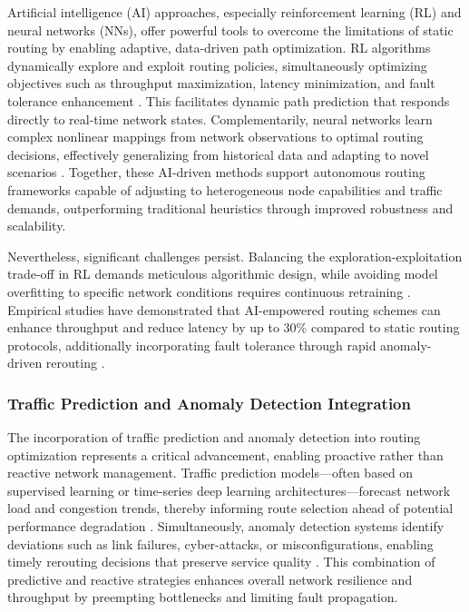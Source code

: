 \documentclass[sigconf]{acmart}
\begin{document}
Artificial intelligence (AI) approaches, especially reinforcement learning (RL) and neural networks (NNs), offer powerful tools to overcome the limitations of static routing by enabling adaptive, data-driven path optimization. RL algorithms dynamically explore and exploit routing policies, simultaneously optimizing objectives such as throughput maximization, latency minimization, and fault tolerance enhancement \cite{ref4}. This facilitates dynamic path prediction that responds directly to real-time network states. Complementarily, neural networks learn complex nonlinear mappings from network observations to optimal routing decisions, effectively generalizing from historical data and adapting to novel scenarios \cite{ref17}\textemdash\cite{ref20}. Together, these AI-driven methods support autonomous routing frameworks capable of adjusting to heterogeneous node capabilities and traffic demands, outperforming traditional heuristics through improved robustness and scalability.

Nevertheless, significant challenges persist. Balancing the exploration-exploitation trade-off in RL demands meticulous algorithmic design, while avoiding model overfitting to specific network conditions requires continuous retraining \cite{ref53}. Empirical studies have demonstrated that AI-empowered routing schemes can enhance throughput and reduce latency by up to 30\% compared to static routing protocols, additionally incorporating fault tolerance through rapid anomaly-driven rerouting \cite{ref4}.

\subsubsection{Traffic Prediction and Anomaly Detection Integration}

The incorporation of traffic prediction and anomaly detection into routing optimization represents a critical advancement, enabling proactive rather than reactive network management. Traffic prediction models—often based on supervised learning or time-series deep learning architectures—forecast network load and congestion trends, thereby informing route selection ahead of potential performance degradation \cite{ref50}. Simultaneously, anomaly detection systems identify deviations such as link failures, cyber-attacks, or misconfigurations, enabling timely rerouting decisions that preserve service quality \cite{ref53}. This combination of predictive and reactive strategies enhances overall network resilience and throughput by preempting bottlenecks and limiting fault propagation.
\end{document}
